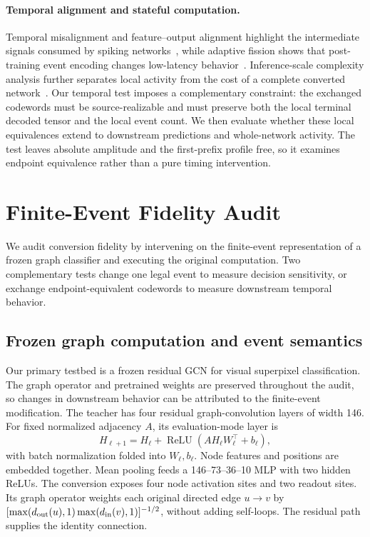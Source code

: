 \documentclass[10pt,twocolumn,letterpaper]{article}
\begin{document}
\paragraph{Temporal alignment and stateful computation.}
Temporal misalignment and feature--output alignment highlight the intermediate signals consumed by spiking networks~\cite{bojkovic2025,li2026cka}, while adaptive fission shows that post-training event encoding changes low-latency behavior~\cite{jiang2025fission}. Inference-scale complexity analysis further separates local activity from the cost of a complete converted network~\cite{bu2025complexity}. Our temporal test imposes a complementary constraint: the exchanged codewords must be source-realizable and must preserve both the local terminal decoded tensor and the local event count. We then evaluate whether these local equivalences extend to downstream predictions and whole-network activity. The test leaves absolute amplitude and the first-prefix profile free, so it examines endpoint equivalence rather than a pure timing intervention.

\section{Finite-Event Fidelity Audit}
We audit conversion fidelity by intervening on the finite-event representation of a frozen graph classifier and executing the original computation. Two complementary tests change one legal event to measure decision sensitivity, or exchange endpoint-equivalent codewords to measure downstream temporal behavior.

\subsection{Frozen graph computation and event semantics}
Our primary testbed is a frozen residual GCN for visual superpixel classification. The graph operator and pretrained weights are preserved throughout the audit, so changes in downstream behavior can be attributed to the finite-event modification. The teacher has four residual graph-convolution layers of width 146. For fixed normalized adjacency $A$, its evaluation-mode layer is
\begin{equation}
 H_{\ell+1}=H_\ell+\operatorname{ReLU}(AH_\ell W_\ell^\top+b_\ell),
 \label{eq:block}
\end{equation}
with batch normalization folded into $W_\ell,b_\ell$. Node features and positions are embedded together. Mean pooling feeds a 146--73--36--10 MLP with two hidden ReLUs. The conversion exposes four node activation sites and two readout sites. Its graph operator weights each original directed edge $u\!\to\!v$ by $[\max(d_{\rm out}(u),1)\max(d_{\rm in}(v),1)]^{-1/2}$, without adding self-loops. The residual path supplies the identity connection.
\end{document}
